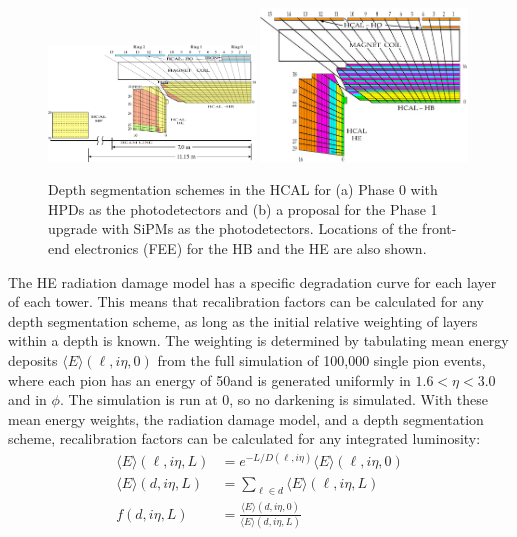 \begin{figure}[hbtp]
  \begin{center}
    \includegraphics[width=0.49\textwidth]{figures/HCAL-HB-HE-HO-HF.pdf}
    \includegraphics[width=0.49\textwidth]{figures/new_segmentation.png}
    \caption{Depth segmentation schemes in the HCAL for (a) Phase 0 with HPDs as the photodetectors and (b) a proposal for the Phase 1 upgrade with SiPMs as the photodetectors.
			Locations of the front-end electronics (FEE) for the HB and the HE are also shown.~\cite{hcaluptdr}}
    \label{fig:hcaldepths}
  \end{center}
\end{figure}

The HE radiation damage model has a specific degradation curve for each layer of each tower. This means that recalibration factors can be calculated for any depth segmentation scheme, as long as the initial relative weighting of layers within a depth is known. The weighting is determined by tabulating mean energy deposits $\langle E \rangle (\ell,i\eta,0)$ from the full simulation of 100,000 single pion events, where each pion has an energy of 50\GeV and is generated uniformly in $1.6 < \eta < 3.0$ and in $\phi$. The simulation is run at 0\fbinv, so no darkening is simulated. With these mean energy weights, the radiation damage model, and a depth segmentation scheme, recalibration factors can be calculated for any integrated luminosity:
\begin{align}
\langle E \rangle (\ell,i\eta,L) &= e^{-L/D(\ell,i\eta)}\langle E \rangle (\ell,i\eta,0) \label{eq:avgE_layer}\\
\langle E \rangle (d,i\eta,L) &= \sum_{\ell \in d} \langle E \rangle (\ell,i\eta,L) \label{eq:avgE_depth}\\
f(d,i\eta,L) &= \frac{\langle E \rangle (d,i\eta,0)}{\langle E \rangle (d,i\eta,L)} \label{eq:factor_depth}
\end{align}

